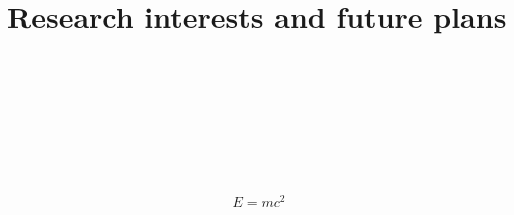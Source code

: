\pagestyle{RS}
\section*{\textcolor{Burnt Orange}{Research interests and future plans}\hrulefill}
\lipsum[1] \\

\lipsum[2] \\

\lipsum[3] \\

\lipsum[4] \\

\lipsum[5] \\

\lipsum[6] \\

\lipsum[7] \\

\begin{gather*}
    E = mc^2
\end{gather*}